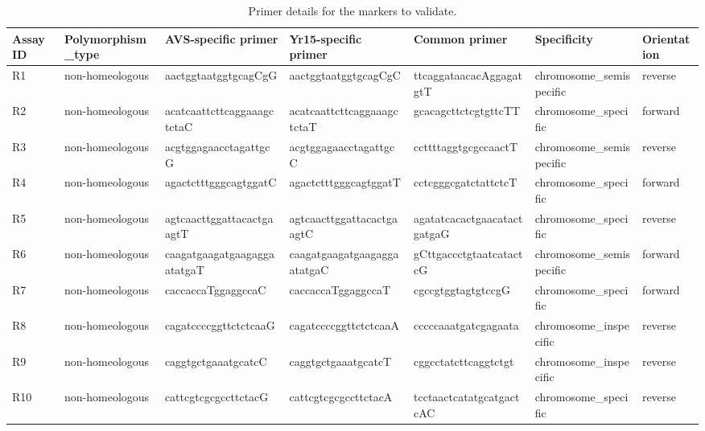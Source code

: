 \begin{sidewaystable}
\caption{Primer details for the markers to validate. }
\centering
\label{tab:yr15:polymarker}
\begin{localsize}{6}{9}

\begin{tabular}{lllllll}
\toprule
 Assay ID   & Polymorphism\_type   & AVS-specific primer         & Yr15-specific primer        & Common primer               & Specificity             & Orientation   \\
\midrule
 R1         & non-homeologous     & aactggtaatggtgcagCgG        & aactggtaatggtgcagCgC        & ttcaggataacacAggagatgtT     & chromosome\_semispecific & reverse       \\
 R2         & non-homeologous     & acatcaattcttcaggaaagctctaC  & acatcaattcttcaggaaagctctaT  & gcacagcttctcgtgttcTT        & chromosome\_specific     & forward       \\
 R3         & non-homeologous     & acgtggagaacctagattgcG       & acgtggagaacctagattgcC       & ccttttaggtgcgccaactT        & chromosome\_semispecific & reverse       \\
 R4         & non-homeologous     & agactctttgggcagtggatC       & agactctttgggcagtggatT       & cctcgggcgatctattctcT        & chromosome\_specific     & forward       \\
 R5         & non-homeologous     & agtcaacttggattacactgaagtT   & agtcaacttggattacactgaagtC   & agatatcacactgaacatactgatgaG & chromosome\_specific     & reverse       \\
 R6         & non-homeologous     & caagatgaagatgaagaggaatatgaT & caagatgaagatgaagaggaatatgaC & gCttgaccctgtaatcatactcG     & chromosome\_semispecific & forward       \\
 R7         & non-homeologous     & caccaccaTggaggccaC          & caccaccaTggaggccaT          & cgccgtggtagtgtccgG          & chromosome\_specific     & forward       \\
 R8         & non-homeologous     & cagatccccggttctctcaaG       & cagatccccggttctctcaaA       & cccccaaatgatcgagaata        & chromosome\_inspecific   & reverse       \\
 R9         & non-homeologous     & caggtgctgaaatgcatcC         & caggtgctgaaatgcatcT         & cggcctatcttcaggtctgt        & chromosome\_inspecific   & reverse       \\
 R10        & non-homeologous     & cattcgtcgcgccttctacG        & cattcgtcgcgccttctacA        & tcctaactcatatgcatgactcAC    & chromosome\_specific     & reverse       \\

\end{tabular}
\end{localsize}
\end{sidewaystable}
